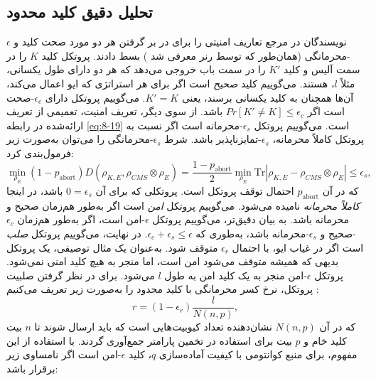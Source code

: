 \subsection{تحلیل دقیق کلید محدود}
\label{sec:8-2-2}
نویسندگان در مرجع \cite{8-41} تعاریف امنیتی را برای در بر گرفتن هر دو مورد صحت کلید و $\epsilon$-محرمانگی (همان‌طور که توسط رنر معرفی شد \cite{8-28}) بسط دادند. پروتکل  کلید $K$ را در سمت آلیس و کلید $K'$ را در سمت باب خروجی می‌دهد که هر دو دارای طول یکسانی، مثلاً $l$، هستند. می‌گوییم کلید \textit{صحیح} است اگر برای هر استراتژی که ایو اعمال می‌کند، آن‌ها همچنان به کلید یکسانی برسند، یعنی $K' = K$. می‌گوییم پروتکل  دارای $\epsilon_c$-صحت است اگر $Pr[K' \neq K] \leq \epsilon_c$ باشد. از سوی دیگر، تعریف امنیت، تعمیمی از تعریف ارائه‌شده در رابطه \eqref{eq:8-19} است. می‌گوییم پروتکل $\epsilon_s$-محرمانه است اگر نسبت به پروتکل کاملاً محرمانه، $\epsilon_s$-تمایزناپذیر باشد. شرط $\epsilon_s$-محرمانگی را می‌توان به‌صورت زیر فرمول‌بندی کرد:
\begin{equation}
	\min_{\rho_E} (1 - p_{\text{abort}}) D(\rho_{K,E}, \rho_{CMS} \otimes \rho_E) = \frac{1 - p_{\text{abort}}}{2} \min_{\rho_E} \text{Tr} |\rho_{K,E} - \rho_{CMS} \otimes \rho_E| \leq \epsilon_s,
	\label{eq:8-45}
\end{equation}
که در آن $p_{\text{abort}}$ احتمال توقف پروتکل است. پروتکلی که برای آن $0 = \epsilon_s$ باشد، در اینجا \textit{کاملاً محرمانه} نامیده می‌شود. می‌گوییم پروتکل \textit{امن} است اگر به‌طور هم‌زمان صحیح و محرمانه باشد. به بیان دقیق‌تر، می‌گوییم پروتکل $\epsilon$-امن است، اگر به‌طور هم‌زمان $\epsilon_c$-صحیح و $\epsilon_s$-محرمانه باشد، به‌طوری که $\epsilon_c + \epsilon_s \leq \epsilon$. در نهایت، می‌گوییم پروتکل \textit{صلب} است اگر در غیاب ایو، با احتمال $\epsilon_r$ متوقف شود. به‌عنوان یک مثال توصیفی، یک پروتکل بدیهی که همیشه متوقف می‌شود امن است، اما منجر به هیچ کلید امنی نمی‌شود. پروتکل $\epsilon$-امن منجر به یک کلید امن به طول $l$ می‌شود. برای در نظر گرفتن صلبیت پروتکل، نرخ کسر محرمانگی با کلید محدود را به‌صورت زیر تعریف می‌کنیم \cite{8-41}:
\begin{equation}
	r = (1 - \epsilon_r) \frac{l}{N(n, p)},
	\label{eq:8-46}
\end{equation}
که در آن $N(n, p)$ نشان‌دهنده تعداد کیوبیت‌هایی است که باید ارسال شوند تا $n$ بیت کلید خام و $p$ بیت برای استفاده در تخمین پارامتر جمع‌آوری گردند. با استفاده از این مفهوم، برای منبع کوانتومی با کیفیت آماده‌سازی $q$، کلید $\epsilon$-امن است اگر نامساوی زیر برقرار باشد:

